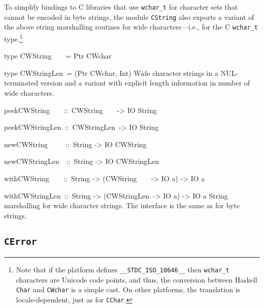 \documentclass[a4paper,twoside]{article}
\makeatletter
\newcommand{\code}[1]{\texttt{#1}}      %
\newenvironment{codedesc}{%
  \list{}{\labelwidth\z@
    \let\makelabel\codedesclabel}
  }{%
  \endlist
  }
\newcommand*{\codedesclabel}[1]{%
  \hspace{-\leftmargin}
  \parbox[b]{\labelwidth}{\makebox[0pt][l]{\code{#1}}\\}\hfil\relax
  }
\newcommand{\combineitems}{\vspace*{-\itemsep}\vspace*{-\parsep}\vspace*{-1em}}
\makeatother
\begin{document}
To simplify bindings to C libraries that use \code{wchar\_t} for character
sets that cannot be encoded in byte strings, the module \code{CString} also
exports a variant of the above string marshalling routines for wide
characters---i.e., for the C \code{wchar\_t} type.\footnote{Note that if the
  platform defines \code{\_\_STDC\_ISO\_10646\_\_} then \code{wchar\_t}
  characters are Unicode code points, and thus, the conversion between Haskell
  \code{Char} and \code{CWchar} is a simple cast.  On other platforms, the
  translation is locale-dependent, just as for \code{CChar}.}
%
\begin{codedesc}
\item[type CWString~~~~= Ptr CWchar]
\item[type CWStringLen~= (Ptr CWchar, Int)] \combineitems
  Wide character strings in a NUL-terminated version and a variant with
  explicit length information in number of wide characters.

\item[peekCWString~~~~::\ CWString~~~~-> IO String]
\item[peekCWStringLen~::\ CWStringLen~-> IO String]\combineitems
\item[newCWString~~~~~::\ String -> IO CWString]\combineitems
\item[newCWStringLen~~::\ String -> IO CWStringLen] \combineitems
\item[withCWString~~~~::\ String -> (CWString~~~~-> IO a) -> IO a]\combineitems
\item[withCWStringLen~::\ String -> (CWStringLen~-> IO a) -> IO a]
  \combineitems String marshalling for wide character strings.  The interface
  is the same as for byte strings.
\end{codedesc}

\subsection{\code{CError}}
\label{sec:CError}
\end{document}
